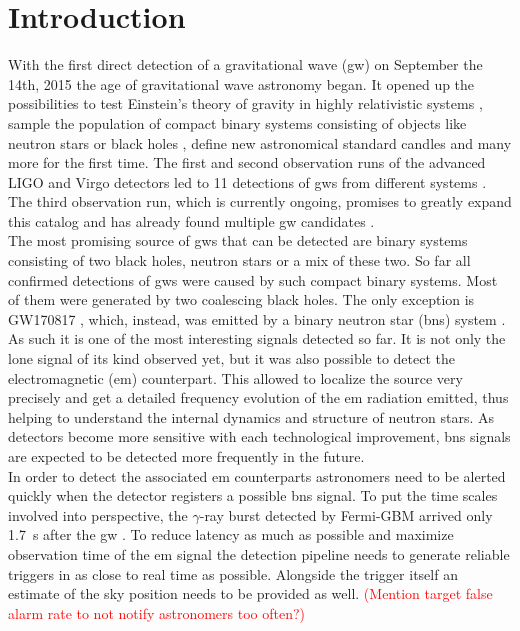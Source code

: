 \section{Introduction}
With the first direct detection of a gravitational wave (\gls{gw}) on September the 14th, 2015 \cite{gw150914} the age of gravitational wave astronomy began. It opened up the possibilities to test Einstein's theory of gravity in highly relativistic systems \cite{test_gr_gw150914}, sample the population of compact binary systems consisting of objects like neutron stars or black holes \cite{population_binary_systems}, define new astronomical standard candles \cite{standard_candles} and many more for the first time. The first and second observation runs of the advanced LIGO and Virgo detectors \cite{aligo, avirgo} led to 11 detections of \gls{gw}s from different systems \cite{catalog}. The third observation run, which is currently ongoing, promises to greatly expand this catalog and has already found multiple \gls{gw} candidates \cite{o3_alerts}.\\
The most promising source of \gls{gw}s that can be detected are binary systems consisting of two black holes, neutron stars or a mix of these two. So far all confirmed detections of \gls{gw}s were caused by such compact binary systems. Most of them were generated by two coalescing black holes. The only exception is GW170817 \cite{catalog}, which, instead, was emitted by a binary neutron star (\gls{bns}) system \cite{gw170817}. As such it is one of the most interesting signals detected so far. It is not only the lone signal of its kind observed yet, but it was also possible to detect the electromagnetic (\gls{em}) counterpart. This allowed to localize the source very precisely and get a detailed frequency evolution of the \gls{em} radiation emitted, thus helping to understand the internal dynamics and structure of neutron stars. As detectors become more sensitive with each technological improvement, \gls{bns} signals are expected to be detected more frequently in the future.\\
In order to detect the associated \gls{em} counterparts astronomers need to be alerted quickly when the detector registers a possible \gls{bns} signal. To put the time scales involved into perspective, the $\gamma$-ray burst detected by Fermi-GBM arrived only \SI{1.7}{\s} after the \gls{gw} \cite{gw170817}. To reduce latency as much as possible and maximize observation time of the \gls{em} signal the detection pipeline needs to generate reliable triggers in as close to real time as possible. Alongside the trigger itself an estimate of the sky position needs to be provided as well. \textcolor{red}{(Mention target false alarm rate to not notify astronomers too often?)}\\
